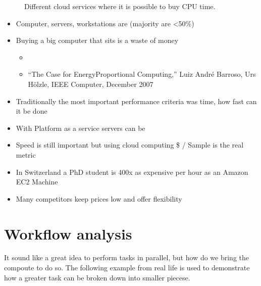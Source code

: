 \documentclass[letterpaper,10pt,english]{sphinxmanual}
\begin{document}
\begin{figure}[htbp]
\centering
\capstart

\noindent{}
\caption{Different cloud services where it is possible to buy CPU time.}\label{\detokenize{01-Introduction:id24}}\end{figure}
\begin{itemize}
\item {} 
\sphinxAtStartPar
Computer, servers, workstations are  (majority are \textless{}50\%)

\item {} 
\sphinxAtStartPar
Buying a big computer that sits  is a waste of money
\begin{itemize}
\item {} 
\sphinxAtStartPar
{}

\item {} 
\sphinxAtStartPar
“The Case for Energy\sphinxhyphen{}Proportional Computing,” Luiz André Barroso, Urs Hölzle, IEEE Computer, December 2007

\end{itemize}

\item {} 
\sphinxAtStartPar
Traditionally the most important performance criteria was time, how fast can it be done

\item {} 
\sphinxAtStartPar
With Platform as a service servers can be 

\item {} 
\sphinxAtStartPar
Speed is still important but using cloud computing \$ / Sample is the real metric

\item {} 
\sphinxAtStartPar
In Switzerland a PhD student is 400x as expensive per hour as an Amazon EC2 Machine

\item {} 
\sphinxAtStartPar
Many competitors keep prices low and offer flexibility

\end{itemize}




\section{Workflow analysis}
\label{\detokenize{01-Introduction:workflow-analysis}}
\sphinxAtStartPar
It sound like a great idea to perform tasks in parallel, but how do we bring the compoute to do so. The following example from real life is used to demonstrate how a greater task can be broken down into smaller piecese.
\end{document}
